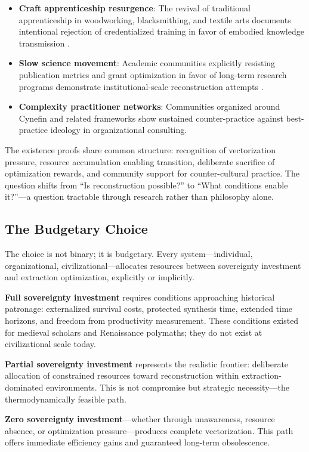 \begin{itemize}
\item \textbf{Craft apprenticeship resurgence}: The revival of traditional apprenticeship in woodworking, blacksmithing, and textile arts documents intentional rejection of credentialized training in favor of embodied knowledge transmission \citep{sennett2008}.
\item \textbf{Slow science movement}: Academic communities explicitly resisting publication metrics and grant optimization in favor of long-term research programs demonstrate institutional-scale reconstruction attempts \citep{stengers2018}.
\item \textbf{Complexity practitioner networks}: Communities organized around Cynefin and related frameworks show sustained counter-practice against best-practice ideology in organizational consulting.
\end{itemize}

The existence proofs share common structure: recognition of vectorization pressure, resource accumulation enabling transition, deliberate sacrifice of optimization rewards, and community support for counter-cultural practice. The question shifts from ``Is reconstruction possible?'' to ``What conditions enable it?''---a question tractable through research rather than philosophy alone.

\subsection{The Budgetary Choice}

The choice is not binary; it is budgetary. Every system---individual, organizational, civilizational---allocates resources between sovereignty investment and extraction optimization, explicitly or implicitly.

\textbf{Full sovereignty investment} requires conditions approaching historical patronage: externalized survival costs, protected synthesis time, extended time horizons, and freedom from productivity measurement. These conditions existed for medieval scholars and Renaissance polymaths; they do not exist at civilizational scale today.

\textbf{Partial sovereignty investment} represents the realistic frontier: deliberate allocation of constrained resources toward reconstruction within extraction-dominated environments. This is not compromise but strategic necessity---the thermodynamically feasible path.

\textbf{Zero sovereignty investment}---whether through unawareness, resource absence, or optimization pressure---produces complete vectorization. This path offers immediate efficiency gains and guaranteed long-term obsolescence.

